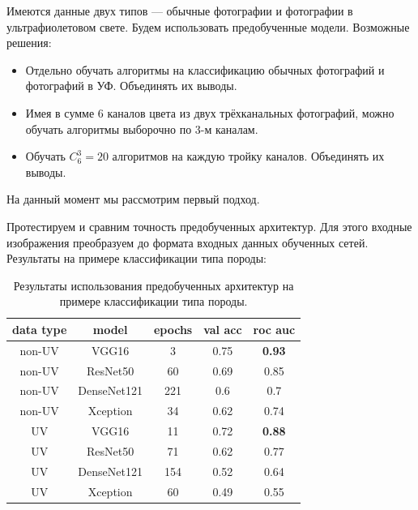 \documentclass[14pt]{matmex-diploma}
\begin{document}
        Имеются данные двух типов — обычные фотографии и фотографии в ультрафиолетовом свете. Будем использовать предобученные модели. Возможные решения:
        
        \begin{itemize}
            \item Отдельно обучать алгоритмы на классификацию обычных фотографий и фотографий в УФ. Объединять их выводы.
            \item Имея в сумме 6 каналов цвета из двух трёхканальных фотографий, можно обучать алгоритмы выборочно по 3-м каналам.
            \item Обучать $C_{6}^{3}=20$ алгоритмов на каждую тройку каналов. Объединять их выводы.
        \end{itemize}         
    
        На данный момент мы рассмотрим первый подход.    
    
        Протестируем и сравним точность предобученных архитектур. Для этого входные изображения преобразуем до формата входных данных обученных сетей. Результаты на примере классификации типа породы:
        
        \begin{table}[h!]
            \centering
            \begin{tabular}{|c|c|c|c|c|}
            \hline
            \textbf{data type} & \textbf{model} & \textbf{epochs} & \textbf{val acc} & \textbf{roc auc} \\ \hline
            non-UV             & VGG16          & 3               & 0.75             & \textbf{0.93}    \\ \hline
            non-UV             & ResNet50       & 60              & 0.69             & 0.85             \\ \hline
            non-UV             & DenseNet121    & 221             & 0.6              & 0.7              \\ \hline
            non-UV             & Xception       & 34              & 0.62             & 0.74             \\ \hline
            UV                 & VGG16          & 11              & 0.72             & \textbf{0.88}    \\ \hline
            UV                 & ResNet50       & 71              & 0.62             & 0.77             \\ \hline
            UV                 & DenseNet121    & 154             & 0.52             & 0.64             \\ \hline
            UV                 & Xception       & 60              & 0.49             & 0.55             \\ \hline
            \end{tabular}
            \caption{Результаты использования предобученных архитектур на примере классификации типа породы.}
            \label{results}   
        \end{table}
        
\end{document}
